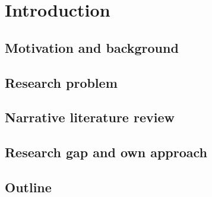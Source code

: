 \chapter{Introduction}
\section{Motivation and background}
\section{Research problem}
\section{Narrative literature review}
\section{Research gap and own approach}
\section{Outline}
